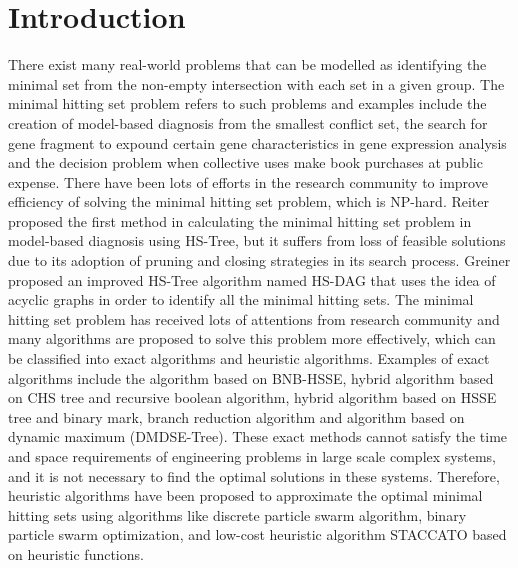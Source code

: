 \section{Introduction}
There exist many real-world problems that can be modelled as identifying the minimal set from the non-empty intersection with each set in a given group.
The minimal hitting set problem refers to such problems and examples include the creation of model-based diagnosis from the smallest conflict set, the search for gene fragment to expound certain gene characteristics in gene expression analysis and the decision problem when collective uses make book purchases at public expense.
There have been lots of efforts in the research community to improve efficiency of solving the minimal hitting set problem, which is NP-hard.
Reiter proposed the first method in calculating the minimal hitting set problem in model-based diagnosis using HS-Tree, but it suffers from loss of feasible solutions due to its adoption of pruning and closing strategies in its search process.
Greiner proposed an improved HS-Tree algorithm named HS-DAG that uses the idea of acyclic graphs in order to identify all the minimal hitting sets.
The minimal hitting set problem has received lots of attentions from research community and many algorithms are proposed to solve this problem more effectively, which can be classified into exact algorithms and heuristic algorithms.
Examples of exact algorithms include the algorithm based on BNB-HSSE, hybrid algorithm based on CHS tree and recursive boolean algorithm, hybrid algorithm based on HSSE tree and binary mark, branch reduction algorithm and algorithm based on dynamic maximum (DMDSE-Tree).
These exact methods cannot satisfy the time and space requirements of engineering problems in large scale complex systems, and it is not necessary to find the optimal solutions in these systems.
Therefore, heuristic algorithms have been proposed to approximate the optimal minimal hitting sets using algorithms like discrete particle swarm algorithm, binary particle swarm optimization, and low-cost heuristic algorithm STACCATO based on heuristic functions.


